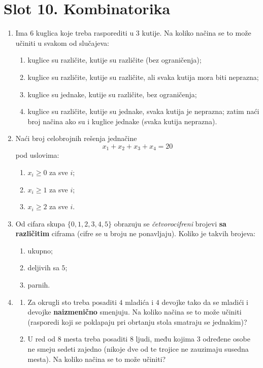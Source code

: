 \section*{Slot 10. Kombinatorika}
\begin{enumerate}[label=\arabic*.]
\item Ima $6$ kuglica koje treba rasporediti u $3$ kutije. Na koliko načina se to može učiniti u svakom od slučajeva:
\begin{enumerate}[label=\alph*)]
\item kuglice su različite, kutije su različite (bez ograničenja);
\item kuglice su različite, kutije su različite, ali svaka kutija mora biti neprazna;
\item kuglice su jednake, kutije su različite, bez ograničenja;
\item kuglice su različite, kutije su jednake, svaka kutija je neprazna; zatim naći broj načina ako su i kuglice jednake (svaka kutija neprazna).
\end{enumerate}

\item Naći broj celobrojnih rešenja jednačine
\[
x_1+x_2+x_3+x_4=20
\]
pod uslovima:
\begin{enumerate}[label=\alph*)]
\item $x_i\ge 0$ za sve $i$;
\item $x_i\ge 1$ za sve $i$;
\item $x_i\ge 2$ za sve $i$.
\end{enumerate}

\item Od cifara skupa $\{0,1,2,3,4,5\}$ obrazuju se \emph{četvorocifreni} brojevi \textbf{sa različitim} ciframa (cifre se u broju ne ponavljaju). Koliko je takvih brojeva:
\begin{enumerate}[label=\alph*)]
\item ukupno;
\item deljivih sa $5$;
\item parnih.
\end{enumerate}

\item \begin{enumerate}[label=\alph*)]
\item Za okrugli sto treba posaditi $4$ mladića i $4$ devojke tako da se mladići i devojke \textbf{naizmenično} smenjuju. Na koliko načina se to može učiniti (rasporedi koji se poklapaju pri obrtanju stola smatraju se jednakim)?
\item U red od $8$ mesta treba posaditi $8$ ljudi, među kojima $3$ određene osobe ne smeju sedeti zajedno (nikoje dve od te trojice ne zauzimaju susedna mesta). Na koliko načina se to može učiniti?
\end{enumerate}


\end{enumerate}
